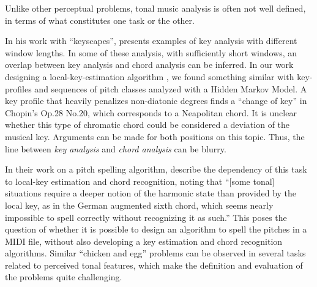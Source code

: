 

Unlike other perceptual problems, tonal music analysis is
often not well defined, in terms of what constitutes one
task or the other.


In his work with ``keyscapes'',
\textcite{sapp2011computational} presents examples of key
analysis with different window lengths. In some of these
analysis, with sufficiently short windows, an overlap
between key analysis and chord analysis can be inferred. In
our work designing a local-key-estimation algorithm
\parencite{napoleslopez2019keyfinding}, we found something
similar with key-profiles and sequences of pitch classes
analyzed with a Hidden Markov Model. A key profile that
heavily penalizes non-diatonic degrees finds a ``change of
key'' in Chopin's Op.28 No.20, which corresponds to a
Neapolitan chord. It is unclear whether this type of
chromatic chord could be considered a deviation of the
musical key. Arguments can be made for both positions on
this topic. Thus, the line between \emph{key analysis} and
\emph{chord analysis} can be blurry.


In their work on a pitch spelling algorithm,
\textcite{teodoru2007pitch} describe the dependency of this
task to local-key estimation and chord recognition, noting
that ``[some tonal] situations require a deeper notion of
the harmonic state than provided by the local key, as in the
German augmented sixth chord, which seems nearly impossible
to spell correctly without recognizing it as such.'' This
poses the question of whether it is possible to design an
algorithm to spell the pitches in a MIDI file, without also
developing a key estimation and chord recognition
algorithms. Similar ``chicken and egg'' problems can be observed in several tasks related to perceived tonal features, which make the definition and evaluation of the problems quite challenging.
